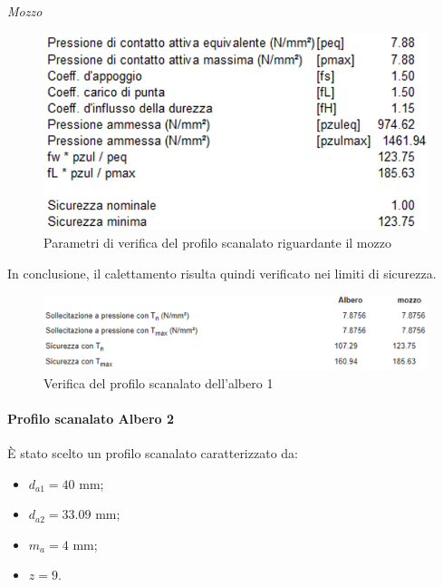 \emph{Mozzo}
\begin{figure}[h]
    \centering
    \includegraphics[scale=0.5]{Immagini/RisultatiScanalatoMozzo1.png}
    \caption{Parametri di verifica del profilo scanalato riguardante il mozzo}
    \label{fig:RisultatiScanalatoMozzo1}
\end{figure}
\newpage
In conclusione, il calettamento risulta quindi verificato nei limiti di sicurezza.
\begin{figure}[h]
    \centering
    \includegraphics[scale=0.5]{Immagini/RisultatiScanalato1.png}
    \caption{Verifica del profilo scanalato dell'albero 1}
    \label{fig:RisultatiScanalato1}
\end{figure}

\paragraph{Profilo scanalato Albero 2}

È stato scelto un profilo scanalato caratterizzato da:
\begin{itemize}
    \item $d_{a1}=40$ mm;
    \item $d_{a2}=33.09$ mm;
    \item $m_a=4$ mm;
    \item $z=9$.
\end{itemize}

